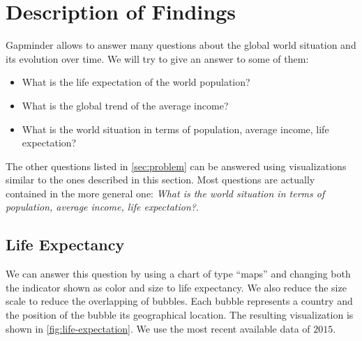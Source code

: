 \section{Description of Findings}
\label{sec:findings}

Gapminder allows to answer many questions about the global world situation and its evolution over time.
We will try to give an answer to some of them:
\begin{itemize}
    \item What is the life expectation of the world population?
    \item What is the global trend of the average income?    
    \item What is the world situation in terms of population, average income, life expectation?
\end{itemize}

The other questions listed in \cref{sec:problem} can be answered using visualizations similar to the ones described in this section.
Most questions are actually contained in the more general one: \textit{What is the world situation in terms of population, average income, life expectation?}.

\subsection{Life Expectancy}
We can answer this question by using a chart of type ``maps'' and changing both the indicator shown as color and size to life expectancy.
We also reduce the size scale to reduce the overlapping of bubbles.
Each bubble represents a country and the position of the bubble its geographical location.
The resulting visualization is shown in \cref{fig:life-expectation}.
We use the most recent available data of $2015$.


